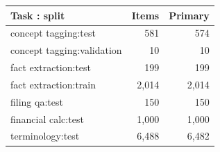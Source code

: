 \begin{tabular}{lrr}
\toprule
Task : split & Items & Primary \\
\midrule
concept tagging:test & 581 & 574 \\
concept tagging:validation & 10 & 10 \\
fact extraction:test & 199 & 199 \\
fact extraction:train & 2{,}014 & 2{,}014 \\
filing qa:test & 150 & 150 \\
financial calc:test & 1{,}000 & 1{,}000 \\
terminology:test & 6{,}488 & 6{,}482 \\
\bottomrule
\end{tabular}
